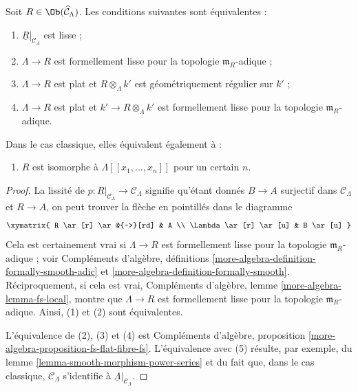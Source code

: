 \begin{lemma}
\label{lemma-smooth}
Soit $R \in \Ob(\widehat{\mathcal{C}}_\Lambda)$. Les conditions suivantes
sont équivalentes :
\begin{enumerate}
\item $\underline{R}|_{\mathcal{C}_\Lambda}$ est lisse ;
\item $\Lambda \to R$ est formellement lisse pour la topologie
$\mathfrak m_R$-adique ;
\item $\Lambda \to R$ est plat et $R \otimes_\Lambda k'$ est
géométriquement régulier sur $k'$ ;
\item $\Lambda \to R$ est plat et $k' \to R \otimes_\Lambda k'$ est
formellement lisse pour la topologie $\mathfrak m_R$-adique.
\end{enumerate}
Dans le cas classique, elles équivalent également à :
\begin{enumerate}
\item[(5)] $R$ est isomorphe à $\Lambda[[x_1, \ldots, x_n]]$ pour un certain
$n$.
\end{enumerate}
\end{lemma}

\begin{proof}
La lissité de
$p : \underline{R}|_{\mathcal{C}_\Lambda} \to \mathcal{C}_\Lambda$
signifie qu'étant donnés $B \to A$ surjectif dans $\mathcal{C}_\Lambda$ et
$R \to A$, on peut trouver la flèche en pointillés dans le diagramme
$$
\xymatrix{
R \ar[r] \ar@{-->}[rd] & A \\
\Lambda \ar[r] \ar[u] & B \ar[u]
}
$$
Cela est certainement vrai si $\Lambda \to R$ est formellement lisse pour la
topologie $\mathfrak m_R$-adique ; voir Compléments d'algèbre, définitions
\ref{more-algebra-definition-formally-smooth-adic} et
\ref{more-algebra-definition-formally-smooth}. Réciproquement, si cela est
vrai, Compléments d'algèbre, lemme \ref{more-algebra-lemma-fs-local}, montre
que $\Lambda \to R$ est formellement lisse pour la topologie
$\mathfrak m_R$-adique. Ainsi, (1) et (2) sont équivalentes.

\medskip\noindent
L'équivalence de (2), (3) et (4) est Compléments d'algèbre, proposition
\ref{more-algebra-proposition-fs-flat-fibre-fs}. L'équivalence avec (5)
résulte, par exemple, du lemme \ref{lemma-smooth-morphism-power-series} et du
fait que, dans le cas classique, $\mathcal{C}_\Lambda$ s'identifie à
$\underline{\Lambda}|_{\mathcal{C}_\Lambda}$.
\end{proof}

